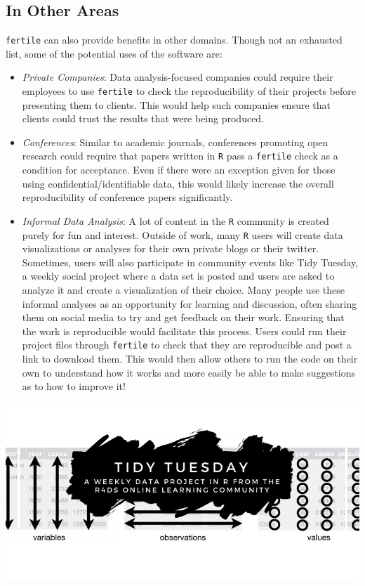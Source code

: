 \documentclass[12pt,twoside]{reedthesis}
\begin{document}
\subsection{In Other Areas}\label{in-other-areas}

\texttt{fertile} can also provide benefits in other domains. Though not
an exhausted list, some of the potential uses of the software are:
\begin{itemize}
\item
  \emph{Private Companies}: Data analysis-focused companies could
  require their employees to use \texttt{fertile} to check the
  reproducibility of their projects before presenting them to clients.
  This would help such companies ensure that clients could trust the
  results that were being produced.
\item
  \emph{Conferences}: Similar to academic journals, conferences
  promoting open research could require that papers written in
  \texttt{R} pass a \texttt{fertile} check as a condition for
  acceptance. Even if there were an exception given for those using
  confidential/identifiable data, this would likely increase the overall
  reproducibility of conference papers significantly.
\item
  \emph{Informal Data Analysis}: A lot of content in the \texttt{R}
  community is created purely for fun and interest. Outside of work,
  many \texttt{R} users will create data visualizations or analyses for
  their own private blogs or their twitter. Sometimes, users will also
  participate in community events like Tidy Tuesday, a weekly social
  project where a data set is posted and users are asked to analyze it
  and create a visualization of their choice. Many people use these
  informal analyses as an opportunity for learning and discussion, often
  sharing them on social media to try and get feedback on their work.
  Ensuring that the work is reproducible would facilitate this process.
  Users could run their project files through \texttt{fertile} to check
  that they are reproducible and post a link to download them. This
  would then allow others to run the code on their own to understand how
  it works and more easily be able to make suggestions as to how to
  improve it!
\end{itemize}
\includegraphics[width=1\linewidth]{figure/tidytuesday}
\end{document}
